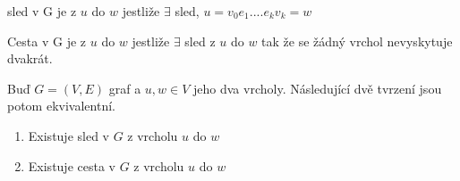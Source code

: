 \documentclass[../main.tex]{subfiles}
\begin{document}
\begin{definition}
    sled v G je z $u$ do $w$ jestliže $\exists$ sled, $u = v_0 e_1 .... e_k v_k = w$

    Cesta v G je z $u$ do $w$ jestliže $\exists$ sled z $u$ do $w$ tak že se žádný vrchol nevyskytuje dvakrát.
\end{definition}


\begin{claim}
    Buď $G=(V,E)$ graf a $u,w\in V$ jeho dva vrcholy. Následující dvě tvrzení jsou potom ekvivalentní.

    \begin{enumerate}
        \item Existuje sled v $G$ z vrcholu $u$ do $w$
        \item Existuje cesta v $G$ z vrcholu $u$ do $w$
    \end{enumerate}
\end{claim}
\end{document}

